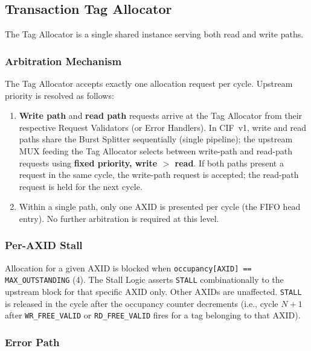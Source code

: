 \documentclass[11pt,a4paper]{article}
\begin{document}
\subsection{Transaction Tag Allocator}

The Tag Allocator is a single shared instance serving both read and write
paths.

\subsubsection*{Arbitration Mechanism}

The Tag Allocator accepts exactly one allocation request per cycle.
Upstream priority is resolved as follows:

\begin{enumerate}
  \item \textbf{Write path} and \textbf{read path} requests arrive at the Tag
        Allocator from their respective Request Validators (or Error Handlers).
        In CIF~v1, write and read paths share the Burst Splitter sequentially
        (single pipeline); the upstream MUX feeding the Tag Allocator selects
        between write-path and read-path requests using \textbf{fixed
        priority, write $>$ read}. If both paths present a request in the same
        cycle, the write-path request is accepted; the read-path request is held
        for the next cycle.
  \item Within a single path, only one AXID is presented per cycle (the FIFO
        head entry). No further arbitration is required at this level.
\end{enumerate}

\subsubsection*{Per-AXID Stall}

Allocation for a given AXID is blocked when
\texttt{occupancy[AXID] == MAX\_OUTSTANDING} (4). The Stall Logic asserts
\texttt{STALL} combinationally to the upstream block for that specific AXID
only. Other AXIDs are unaffected. \texttt{STALL} is released in the cycle
after the occupancy counter decrements (i.e., cycle $N+1$ after
\texttt{WR\_FREE\_VALID} or \texttt{RD\_FREE\_VALID} fires for a tag belonging
to that AXID).

\subsubsection*{Error Path}
\end{document}
